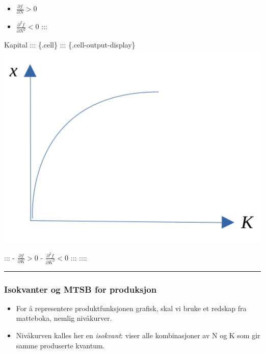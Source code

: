 \documentclass[
  letterpaper,
  DIV=11,
  numbers=noendperiod]{scrartcl}
\providecommand{\tightlist}{%
  \setlength{\itemsep}{0pt}\setlength{\parskip}{0pt}}\usepackage{longtable,booktabs,array}
\begin{document}
\begin{itemize}
\tightlist
\item
  \(\frac{\partial f}{\partial N} > 0\)
\item
  \(\frac{\partial^2 f}{\partial N^2} < 0\) :::
\end{itemize}

Kapital ::: \{.cell\} ::: \{.cell-output-display\}
\includegraphics[width=1\textwidth,height=\textheight]{drawio/prodkk.png}

::: - \(\frac{\partial f}{\partial K} > 0\) -
\(\frac{\partial^2 f}{\partial K^2} < 0\) ::: ::::

\begin{center}\rule{0.5\linewidth}{0.5pt}\end{center}

\subsubsection{Isokvanter og MTSB for
produksjon}\label{isokvanter-og-mtsb-for-produksjon}

\begin{itemize}
\tightlist
\item
  For å representere produktfunksjonen grafisk, skal vi bruke et redskap
  fra matteboka, nemlig nivåkurver.
\item
  Nivåkurven kalles her en \emph{isokvant}: viser alle kombinasjoner av
  N og K som gir samme produserte kvantum.
\end{itemize}
\end{document}
